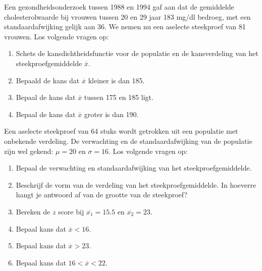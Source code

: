 \begin{exercise}
  Een gezondheidsonderzoek tussen 1988 en 1994 gaf aan dat de gemiddelde cholesterolwaarde bij vrouwen tussen 20 en 29 jaar 183 mg/dl bedroeg, met een standaardafwijking gelijk aan 36. We nemen nu een aselecte steekproef van 81 vrouwen. Los volgende vragen op:

  \begin{enumerate}[label=\alph*.]
    \item Schets de kansdichtheidsfunctie voor de populatie en de kansverdeling van het steekproefgemiddelde $\overline{x}$.
    \item Bepaald de kans dat $\overline{x}$ kleiner is dan 185.
    \item Bepaal de kans dat $\overline{x}$ tussen 175 en 185 ligt.
    \item Bepaal de kans dat $\overline{x}$ groter is dan 190.
  \end{enumerate}
\end{exercise}

\begin{exercise}
  Een aselecte steekproef van 64 stuks wordt getrokken uit een populatie met onbekende verdeling. De verwachting en de standaardafwijking van de populatie
  zijn wel gekend: $\mu = 20$ en $\sigma=16$. Los volgende vragen op:

  \begin{enumerate}[label=\alph*.]
    \item Bepaal de verwachting en standaardafwijking van het steekproefgemiddelde.
    \item Beschrijf de vorm van de verdeling van het steekproefgemiddelde. In hoeverre hangt je antwoord af van de grootte van de steekproef?
    \item Bereken de $z$ score bij $\overline{x_{1}} = 15.5$ en $\overline{x_{2}} = 23$.
    \item Bepaal kans dat $\overline{x} <16$.
    \item Bepaal kans dat $\overline{x} > 23$.
    \item Bepaal kans dat $16< \overline{x}< 22$.
  \end{enumerate}
\end{exercise}

